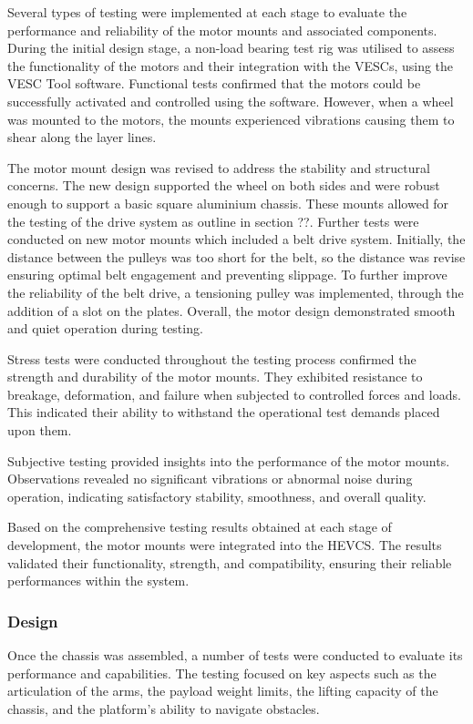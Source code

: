 \documentclass [12pt]{article}
\begin{document}
Several types of testing were implemented at each stage to evaluate the performance and reliability of the motor mounts and associated components.
During the initial design stage, a non-load bearing test rig was utilised to assess the functionality of the motors and their integration with the VESCs, using the VESC Tool software. Functional tests confirmed that the motors could be successfully activated and controlled using the software. However, when a wheel was mounted to the motors, the mounts experienced vibrations causing them to shear along the layer lines.

The motor mount design was revised to address the stability and structural concerns. The new design supported the wheel on both sides and were robust enough to support a basic square aluminium chassis. These mounts allowed for the testing of the drive system as outline in section ??. 
Further tests were conducted on new motor mounts which included a belt drive system. Initially, the distance between the pulleys was too short for the belt, so the distance was revise ensuring optimal belt engagement and preventing slippage. To further improve the reliability of the belt drive, a tensioning pulley was implemented, through the addition of a slot on the plates. Overall, the motor design demonstrated smooth and quiet operation during testing.

Stress tests were conducted throughout the testing process confirmed the strength and durability of the motor mounts. They exhibited resistance to breakage, deformation, and failure when subjected to controlled forces and loads. This indicated their ability to withstand the operational test demands placed upon them.

Subjective testing provided insights into the performance of the motor mounts. Observations revealed no significant vibrations or abnormal noise during operation, indicating satisfactory stability, smoothness, and overall quality. 

Based on the comprehensive testing results obtained at each stage of development, the motor mounts were integrated into the HEVCS. The results validated their functionality, strength, and compatibility, ensuring their reliable performances within the system.

\subsubsection{Design}

Once the chassis was assembled, a number of tests were conducted to evaluate its performance and capabilities. The testing focused on key aspects such as the articulation of the arms, the payload weight limits, the lifting capacity of the chassis, and the platform’s ability to navigate obstacles.
\end{document}
